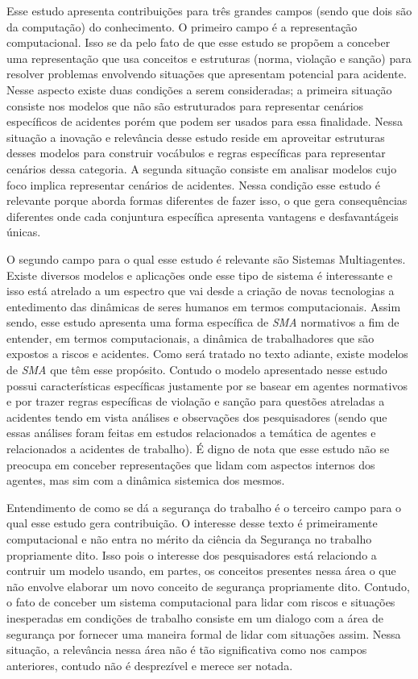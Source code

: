 Esse estudo apresenta contribuições para três grandes campos (sendo que dois são da computação) do conhecimento. O primeiro campo é a representação computacional. Isso se da pelo fato de que esse estudo se propõem a conceber uma representação que usa conceitos e estruturas (norma, violação e sanção) para resolver problemas envolvendo situações que apresentam potencial para acidente. Nesse aspecto existe duas condições a serem consideradas; a primeira situação consiste nos modelos que não são estruturados para representar cenários específicos de acidentes porém que podem ser usados para essa finalidade. Nessa situação a inovação e relevância desse estudo reside em aproveitar estruturas desses modelos para construir vocábulos e regras específicas para representar cenários dessa categoria. A segunda situação consiste em analisar modelos cujo foco implica representar cenários de acidentes. Nessa condição esse estudo é relevante porque aborda formas diferentes de fazer isso, o que gera consequências diferentes onde cada conjuntura específica apresenta vantagens e desfavantágeis únicas.    

O segundo campo para o qual esse estudo é relevante são Sistemas Multiagentes. Existe diversos modelos e aplicações onde esse tipo de sistema é interessante e isso está atrelado a um espectro que vai desde a criação de novas tecnologias a entedimento das dinâmicas de seres humanos em termos computacionais. Assim sendo, esse estudo apresenta uma forma específica de \textit{SMA} normativos a fim de entender, em termos computacionais, a dinâmica de trabalhadores que são expostos a riscos e acidentes. Como será tratado no texto adiante, existe modelos de \textit{SMA} que têm esse propósito. Contudo o modelo apresentado nesse estudo possui características específicas justamente por se basear em agentes normativos e por trazer regras específicas de violação e sanção para questões atreladas a acidentes tendo em vista análises e observações dos pesquisadores (sendo que essas análises foram feitas em estudos relacionados a temática de agentes e relacionados a acidentes de trabalho). É digno de nota que esse estudo não se preocupa em conceber representações que lidam com aspectos internos dos agentes, mas sim com a dinâmica sistemica dos mesmos.

Entendimento de como se dá a segurança do trabalho é o terceiro campo para o qual esse estudo gera contribuição. O interesse desse texto é primeiramente computacional e não entra no mérito da ciência da Segurança no trabalho propriamente dito. Isso pois o interesse dos pesquisadores está relaciondo a contruir um modelo usando, em partes, os conceitos presentes nessa área o que não envolve elaborar um novo conceito de segurança propriamente dito. Contudo, o fato de conceber um sistema computacional para lidar com riscos e situações inesperadas em condições de trabalho consiste em um dialogo com a área de segurança por fornecer uma maneira formal de lidar com situações assim. Nessa situação, a relevância nessa área não é tão significativa como nos campos anteriores, contudo não é desprezível e merece ser notada.